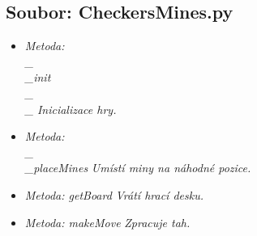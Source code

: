 \documentclass{article}
\begin{document}
\subsection*{Soubor: CheckersMines.py}
\begin{itemize}
 \subsection*{Třída: CheckersMines}
\begin{itemize}
\item{Hra dáma s minami.

Attributes:
    mines (List of [int, int]): seznam pozic min
    explosion ([int, int]): pozice exploze
    withChoosePiece (bool): True, pokud je v hře možné vybrat figurku, jinak False
    numberOfPlayers (int): počet hráčů
    fog (bool): True, pokud je ve hře Fog Of War, jinak False}
\item{Inicializace hry.}
\item{Umístí miny na náhodné pozice.}
\item{Vrátí hrací desku.}
\item{Zpracuje tah.}
\end{itemize}
\item \textit{Metoda: \\_\\_init\\_\\_}
\textit{Inicializace hry.}
\item \textit{Metoda: \\_\\_placeMines}
\textit{Umístí miny na náhodné pozice.}
\item \textit{Metoda: getBoard}
\textit{Vrátí hrací desku.}
\item \textit{Metoda: makeMove}
\textit{Zpracuje tah.}
\end{itemize}
\end{document}

